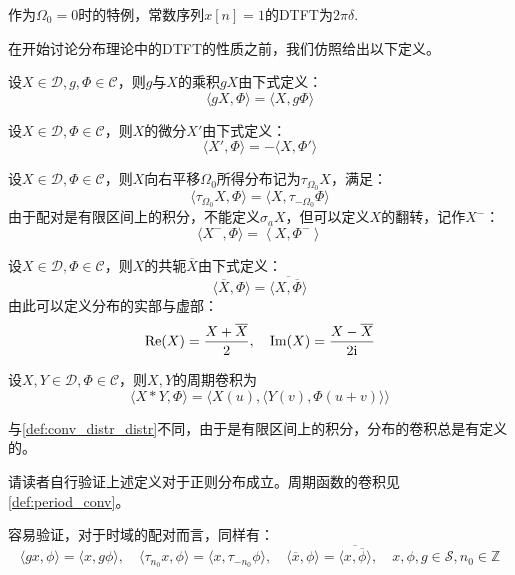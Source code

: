 作为$\Omega_0=0$时的特例，常数序列$x[n]=1$的DTFT为$2\pi\delta$.

在开始讨论分布理论中的DTFT的性质之前，我们仿照给出以下定义。

\begin{definition}[分布与函数的乘法]
    设$X\in\mathcal{D},g,\Phi\in\mathcal{C}$，则$g$与$X$的乘积$gX$由下式定义：
    $$\langle gX,\Phi\rangle=\langle X,g\Phi\rangle$$
\end{definition}

\begin{definition}[分布的微分]
    设$X\in\mathcal{D},\Phi\in\mathcal{C}$，则$X$的微分$X'$由下式定义：
    $$\langle X',\Phi\rangle=-\langle X,\Phi'\rangle$$
\end{definition}

\begin{definition}[分布的平移与伸缩]
    设$X\in\mathcal{D},\Phi\in\mathcal{C}$，则$X$向右平移$\Omega_0$所得分布记为$\tau_{\Omega_0}X$，满足：
    $$\langle \tau_{\Omega_0}X,\Phi \rangle=\langle X,\tau_{-\Omega_0}\Phi \rangle$$
    由于配对是有限区间上的积分，不能定义$\sigma_a X$，但可以定义$X$的翻转，记作$X^-$：
    $$\langle X^-,\Phi \rangle=\left\langle X,\Phi^- \right\rangle$$
\end{definition}

\begin{definition}[分布的共轭]
    设$X\in\mathcal{D},\Phi\in\mathcal{C}$，则$X$的共轭$\overline{X}$由下式定义：
    $$\langle \overline{X},\Phi\rangle=\overline{\langle X,\overline{\Phi}\rangle}$$
    由此可以定义分布的实部与虚部：
    $$\mathrm{Re}(X)=\frac{X+\overline{X}}{2},\quad \mathrm{Im}(X)=\frac{X-\overline{X}}{2\mathrm{i}}$$
\end{definition}

\begin{definition}[分布的卷积]
    设$X,Y\in\mathcal{D},\Phi\in\mathcal{C}$，则$X,Y$的周期卷积为
    $$\langle X*Y,\Phi\rangle=\langle X(u),\langle Y(v),\Phi(u+v)\rangle\rangle$$
\end{definition}
与\cref{def:conv_distr_distr}不同，由于是有限区间上的积分，分布的卷积总是有定义的。%

请读者自行验证上述定义对于正则分布成立。周期函数的卷积见\ref{def:period_conv}。

容易验证，对于时域的配对而言，同样有：
$$\langle gx,\phi\rangle=\langle x,g\phi\rangle,\quad \langle \tau_{n_0}x,\phi \rangle=\langle x,\tau_{-n_0}\phi \rangle,\quad \langle \overline{x},\phi\rangle=\overline{\langle x,\overline{\phi}\rangle},\quad x,\phi,g\in\mathcal{S},n_0\in\mathbb{Z}$$

